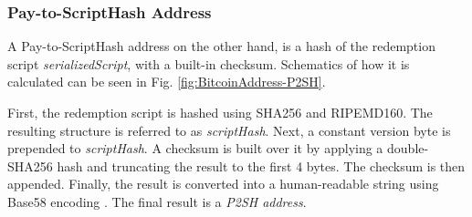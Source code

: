 \subsubsection{Pay-to-ScriptHash Address} \label{sec:Address-P2SH}
A Pay-to-ScriptHash address on the other hand, is a hash of the redemption script \textit{serializedScript}, with a built-in checksum. Schematics of how it is calculated can be seen in Fig. \ref{fig:BitcoinAddress-P2SH}.

First, the redemption script is hashed using SHA256 and RIPEMD160. The resulting structure is referred to as \textit{scriptHash}. Next, a constant version byte is prepended to \textit{scriptHash}. A checksum is built over it by applying a double-SHA256 hash and truncating the result to the first 4 bytes. The checksum is then appended. Finally, the result is converted into a human-readable string using Base58 encoding \cite{Base58}. The final result is a \emph{P2SH address}.

